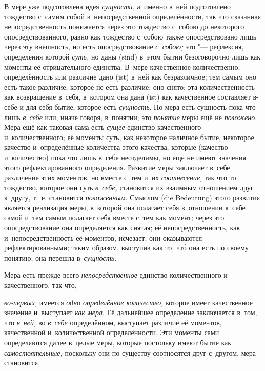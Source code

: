 В мере уже подготовлена идея {\em сущности,} а~именно в~ней подготовлено
тождество с~самим собой в~непосредственной определённости, так что сказанная
непосредственность понижается через это тождество с~собою до некоторого
опосредствованного, равно как тождество с~собою также опосредствовано лишь
через эту внешность, но есть опосредствование {\em с~собою;} это "---
рефлексия, определения которой {\em суть,} но даны (sind) в~этом бытии
безоговорочно лишь как моменты её отрицательного единства. В~мере качественное
количественно; определённость или различие дано (ist) в~ней как безразличное;
тем самым оно есть такое различие, которое не есть различие; оно снято; эта
количественность как возвращение в~себя, в~котором она дана (ist) как
качественное составляет в-себе-и-для-себя-бытие, которое есть {\em сущность}.
Но мера есть сущность пока что лишь {\em в~себе} или, иначе говоря, в~понятии;
это {\em понятие} меры ещё не {\em положено}. Мера ещё как таковая сама есть
{\em сущее} единство качественного и~количественного; её моменты суть, как
некоторое наличное бытие, некоторое качество и~определённые количества этого
качества, которые (качество и~количество) пока что лишь в~себе неотделимы, но
ещё не имеют значения этого рефлектированного определения. Развитие меры
заключает в~себе различение этих моментов, но вместе с~тем и~их
{\em соотнесение,} так что то тождество, которое они суть {\em в~себе,}
становится их взаимным отношением друг к~другу, т.~е. становится
{\em положенным}. Смыслом (die Bedeutung) этого развития является реализация
меры, в~которой она полагает себя в~отношении к~себе самой и~тем самым полагает
себя вместе с~тем как момент; через это опосредствование она определяется как
снятая; её непосредственность, как и~непосредственность её моментов, исчезает;
они оказываются рефлектированными; таким образом, выступив как то, чт\'{о} она
есть по своему понятию, она перешла в~{\em сущность}.

Мера есть прежде всего {\em непосредственное} единство количественного
и качественного, так что,

{\em во-первых,} имеется {\em одно определённое количество,} которое имеет
качественное значение и~выступает {\em как мера}. Её дальнейшее определение
заключается в~том, что {\em в~ней,} во {\em в~себе} определённом, выступает
различие её моментов, качественной и~количественной определённости. Эти моменты
сами определяются далее в~целые меры, которые постольку имеют бытие как
{\em самостоятельные;} поскольку они по существу соотносятся друг с~другом,
мера становится,

